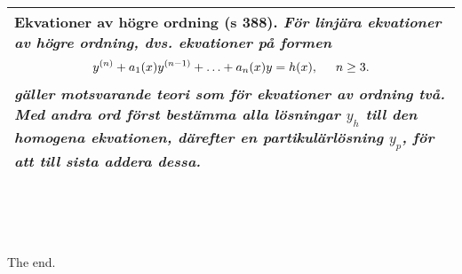 \documentclass[a4paper]{article}
\begin{document}
\\\\\\
\begin{tabular}{|L{11.5cm}|} \hline
\textbf{Ekvationer av högre ordning} (s 388). \textit{För linjära ekvationer av högre ordning, dvs. ekvationer på formen}
\begin{equation*}
\begin{array}{>{\displaystyle}c}
y^{(n)}+a_1(x)y^{(n-1)}+\ldots+a_n(x)y=h(x), \hspace{0.5cm} n \geq 3.
\end{array}
\end{equation*}
\textit{gäller motsvarande teori som för ekvationer av ordning två. Med andra ord först bestämma alla lösningar $y_h$ till den homogena ekvationen, därefter en partikulärlösning $y_p$, för att till sista addera dessa.}
\\\hline
\end{tabular}
\\\\\\
\begin{center}
{The end.} \\ \vspace{0.5cm}
{\Huge \Smiley}
\end{center}
\end{document}
